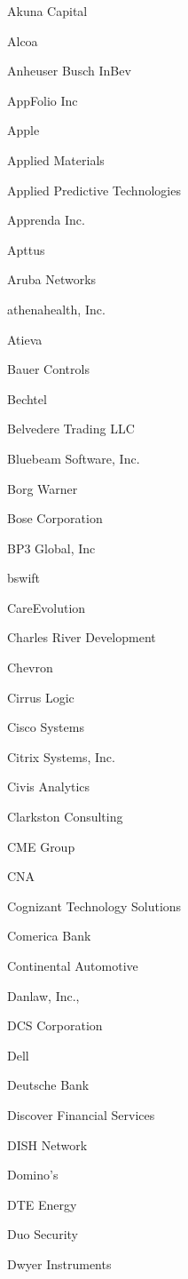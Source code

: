 \documentclass[twoside]{article}
\begin{document}
\begin{center}
\begin{multicols}{5}
\begin{FlushLeft}
\begin{compactitem}
\item Akuna Capital
\item Alcoa
\item Anheuser Busch InBev
\item AppFolio Inc
\item Apple
\item Applied Materials
\item Applied Predictive Technologies
\item Apprenda Inc.
\item Apttus
\item Aruba Networks
\item athenahealth, Inc.
\item Atieva
\item Bauer Controls
\item Bechtel
\item Belvedere Trading LLC
\item Bluebeam Software, Inc.
\item Borg Warner
\item Bose Corporation
\item BP3 Global, Inc
\item bswift
\item CareEvolution
\item Charles River Development
\item Chevron
\item Cirrus Logic
\item Cisco Systems
\item Citrix Systems, Inc.
\item Civis Analytics
\item Clarkston Consulting
\item CME Group
\item CNA
\item Cognizant Technology Solutions
\item Comerica Bank
\item Continental Automotive
\item Danlaw, Inc.,
\item DCS Corporation
\item Dell
\item Deutsche Bank
\item Discover Financial Services
\item DISH Network
\item Domino's
\item DTE Energy
\item Duo Security
\item Dwyer Instruments

\end{compactitem}
\end{FlushLeft}
\end{multicols}
\end{center}
\end{document}

